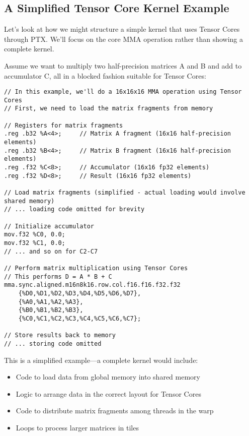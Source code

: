 \subsection{A Simplified Tensor Core Kernel Example}

Let's look at how we might structure a simple kernel that uses Tensor Cores through PTX. We'll focus on the core MMA operation rather than showing a complete kernel.

Assume we want to multiply two half-precision matrices A and B and add to accumulator C, all in a blocked fashion suitable for Tensor Cores:

\begin{lstlisting}[style=ptx]
// In this example, we'll do a 16x16x16 MMA operation using Tensor Cores
// First, we need to load the matrix fragments from memory

// Registers for matrix fragments
.reg .b32 %A<4>;     // Matrix A fragment (16x16 half-precision elements)
.reg .b32 %B<4>;     // Matrix B fragment (16x16 half-precision elements)
.reg .f32 %C<8>;     // Accumulator (16x16 fp32 elements)
.reg .f32 %D<8>;     // Result (16x16 fp32 elements)

// Load matrix fragments (simplified - actual loading would involve shared memory)
// ... loading code omitted for brevity

// Initialize accumulator
mov.f32 %C0, 0.0;
mov.f32 %C1, 0.0;
// ... and so on for C2-C7

// Perform matrix multiplication using Tensor Cores
// This performs D = A * B + C
mma.sync.aligned.m16n8k16.row.col.f16.f16.f32.f32
    {%D0,%D1,%D2,%D3,%D4,%D5,%D6,%D7},
    {%A0,%A1,%A2,%A3},
    {%B0,%B1,%B2,%B3},
    {%C0,%C1,%C2,%C3,%C4,%C5,%C6,%C7};

// Store results back to memory
// ... storing code omitted
\end{lstlisting}

This is a simplified example—a complete kernel would include:

\begin{itemize}
    \item Code to load data from global memory into shared memory
    \item Logic to arrange data in the correct layout for Tensor Cores
    \item Code to distribute matrix fragments among threads in the warp
    \item Loops to process larger matrices in tiles
\end{itemize}

